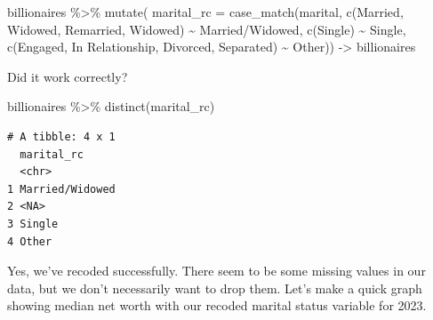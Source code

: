 \documentclass[
  letterpaper,
]{book}
\newenvironment{Shaded}{\begin{snugshade}}{\end{snugshade}}
\newcommand{\AttributeTok}[1]{\textcolor[rgb]{0.40,0.45,0.13}{#1}}
\newcommand{\FunctionTok}[1]{\textcolor[rgb]{0.28,0.35,0.67}{#1}}
\newcommand{\NormalTok}[1]{\textcolor[rgb]{0.00,0.23,0.31}{#1}}
\newcommand{\OtherTok}[1]{\textcolor[rgb]{0.00,0.23,0.31}{#1}}
\newcommand{\SpecialCharTok}[1]{\textcolor[rgb]{0.37,0.37,0.37}{#1}}
\newcommand{\StringTok}[1]{\textcolor[rgb]{0.13,0.47,0.30}{#1}}
\begin{document}
\begin{Shaded}
\begin{Highlighting}[]
\NormalTok{billionaires }\SpecialCharTok{\%\textgreater{}\%}
  \FunctionTok{mutate}\NormalTok{(}
    \AttributeTok{marital\_rc =} \FunctionTok{case\_match}\NormalTok{(marital,}
                            \FunctionTok{c}\NormalTok{(}\StringTok{\textquotesingle{}Married\textquotesingle{}}\NormalTok{, }\StringTok{\textquotesingle{}Widowed, Remarried\textquotesingle{}}\NormalTok{, }\StringTok{\textquotesingle{}Widowed\textquotesingle{}}\NormalTok{) }\SpecialCharTok{\textasciitilde{}} \StringTok{\textquotesingle{}Married/Widowed\textquotesingle{}}\NormalTok{,}
                            \FunctionTok{c}\NormalTok{(}\StringTok{\textquotesingle{}Single\textquotesingle{}}\NormalTok{) }\SpecialCharTok{\textasciitilde{}} \StringTok{\textquotesingle{}Single\textquotesingle{}}\NormalTok{,}
                            \FunctionTok{c}\NormalTok{(}\StringTok{\textquotesingle{}Engaged\textquotesingle{}}\NormalTok{, }\StringTok{\textquotesingle{}In Relationship\textquotesingle{}}\NormalTok{, }\StringTok{\textquotesingle{}Divorced\textquotesingle{}}\NormalTok{, }\StringTok{\textquotesingle{}Separated\textquotesingle{}}\NormalTok{) }\SpecialCharTok{\textasciitilde{}} \StringTok{\textquotesingle{}Other\textquotesingle{}}\NormalTok{)) }\OtherTok{{-}\textgreater{}}\NormalTok{ billionaires}
\end{Highlighting}
\end{Shaded}

Did it work correctly?

\begin{Shaded}
\begin{Highlighting}[]
\NormalTok{billionaires }\SpecialCharTok{\%\textgreater{}\%}
  \FunctionTok{distinct}\NormalTok{(marital\_rc)}
\end{Highlighting}
\end{Shaded}

\begin{verbatim}
# A tibble: 4 x 1
  marital_rc     
  <chr>          
1 Married/Widowed
2 <NA>           
3 Single         
4 Other          
\end{verbatim}

Yes, we've recoded successfully. There seem to be some missing values in
our data, but we don't necessarily want to drop them. Let's make a quick
graph showing median net worth with our recoded marital status variable
for 2023.
\end{document}
